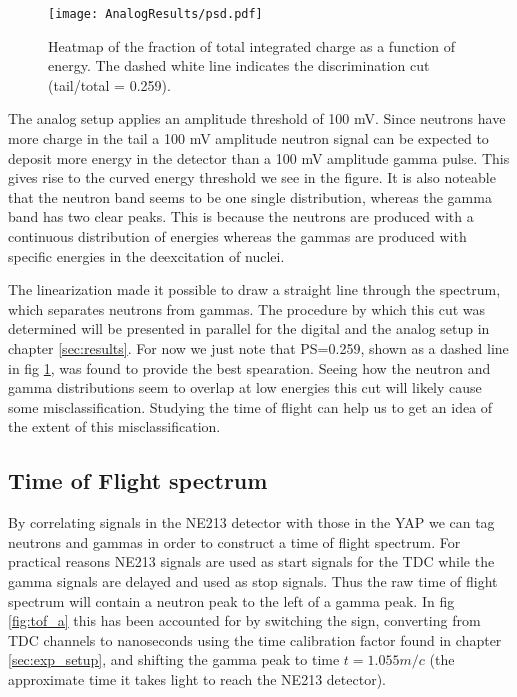 \documentclass[main.tex]{subfiles}
\begin{document}
\begin{figure}[ht]
    \centering
        \texttt{[image: AnalogResults/psd.pdf]}
        \caption{Heatmap of the fraction of total integrated charge as a function of energy. The dashed white line indicates the discrimination cut (tail/total = 0.259).}
        \label{fig:psd_a}
\end{figure}
The analog setup applies an amplitude threshold of 100 mV. Since neutrons have more charge in the tail a 100 mV amplitude neutron signal can be expected to deposit more energy in the detector than a 100 mV amplitude gamma pulse. This gives rise to the curved energy threshold we see in the figure. It is also noteable that the neutron band seems to be one single distribution, whereas the gamma band has two clear peaks. This is because the neutrons are produced with a continuous distribution of energies whereas the gammas are produced with specific energies in the deexcitation of nuclei.

The linearization made it possible to draw a straight line through the spectrum, which separates neutrons from gammas. The procedure by which this cut was determined will be presented in parallel for the digital and the analog setup in chapter \ref{sec:results}. For now we just note that PS=0.259, shown as a dashed line in fig \ref{fig:psd_a}, was found to provide the best spearation. Seeing how the neutron and gamma distributions seem to overlap at low energies this cut will likely cause some misclassification. Studying the time of flight can help us to get an idea of the extent of this misclassification.


\subsection{Time of Flight spectrum}
By correlating signals in the NE213 detector with those in the YAP we can tag neutrons and gammas in order to construct a time of flight spectrum. For practical reasons NE213 signals are used as start signals for the TDC while the gamma signals are delayed and used as stop signals. Thus the raw time of flight spectrum will contain a neutron peak to the left of a gamma peak. In fig \ref{fig:tof_a} this has been accounted for by switching the sign, converting from TDC channels to nanoseconds using the time calibration factor found in chapter \ref{sec:exp_setup}, and shifting the gamma peak to time $t=1.055m/c$ (the approximate time it takes light to reach the NE213 detector). 
\end{document}
